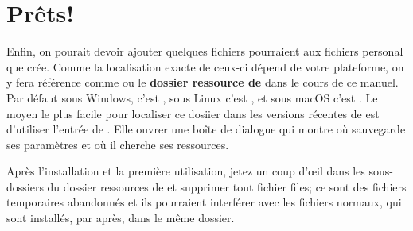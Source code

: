 \section{Prêts!}

Enfin, on pourait devoir ajouter quelques fichiers pourraient aux fichiers \og personal\fg{} que {\Tw} crée. Comme la localisation exacte de ceux-ci dépend de votre plateforme, on y fera référence comme  ou le \textbf{dossier ressource de {\Tw}} dans le cours de ce manuel. Par défaut sous Windows, c'est , sous Linux c'est , et sous macOS c'est . Le moyen le plus facile pour localiser ce dosiier dans les versions récentes de {\Tw} est d'utiliser l'entrée de \submenu{}. Elle ouvrer une boîte de dialogue qui montre où {\Tw} sauvegarde ses paramètres et où il cherche ses ressources.

Après l'installation et la première utilisation, jetez un coup d'œil dans les sous-dossiers du dossier ressources de {\Tw} et supprimer tout fichier  files; ce sont des fichiers temporaires abandonnés et ils pourraient interférer avec les fichiers normaux, qui sont installés, par après, dans le même dossier.
